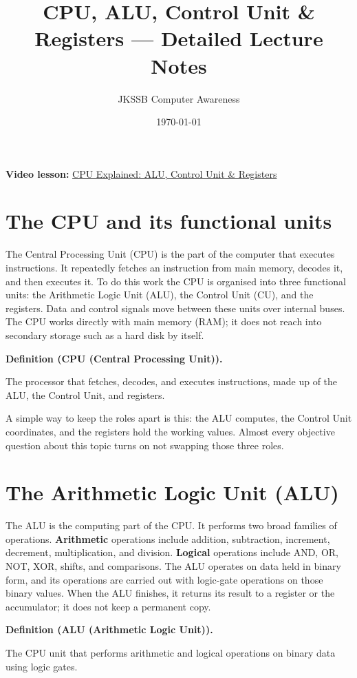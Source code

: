 \documentclass[11pt]{article}
\title{CPU, ALU, Control Unit \& Registers --- Detailed Lecture Notes}
\author{JKSSB Computer Awareness}
\date{\today}
\newenvironment{definitionbox}[1]{%
  \par\noindent\textbf{Definition (#1).}\ \itshape
}{\par\vspace{0.3em}}
\begin{document}
\maketitle

\noindent\textbf{Video lesson:}
\href{https://youtu.be/b6w8uT4GBYQ}{CPU Explained: ALU, Control Unit \& Registers}

\section{The CPU and its functional units}
The Central Processing Unit (CPU) is the part of the computer that executes
instructions. It repeatedly fetches an instruction from main memory, decodes
it, and then executes it. To do this work the CPU is organised into three
functional units: the Arithmetic Logic Unit (ALU), the Control Unit (CU),
and the registers. Data and control signals move between these units over
internal buses. The CPU works directly with main memory (RAM); it does not
reach into secondary storage such as a hard disk by itself.

\begin{definitionbox}{CPU (Central Processing Unit)}
The processor that fetches, decodes, and executes instructions, made up of
the ALU, the Control Unit, and registers.
\end{definitionbox}

A simple way to keep the roles apart is this: the ALU computes, the Control
Unit coordinates, and the registers hold the working values. Almost every
objective question about this topic turns on not swapping those three roles.

\section{The Arithmetic Logic Unit (ALU)}
The ALU is the computing part of the CPU. It performs two broad families of
operations. \textbf{Arithmetic} operations include addition, subtraction,
increment, decrement, multiplication, and division. \textbf{Logical}
operations include AND, OR, NOT, XOR, shifts, and comparisons. The ALU
operates on data held in binary form, and its operations are carried out with
logic-gate operations on those binary values. When the ALU finishes, it
returns its result to a register or the accumulator; it does not keep a
permanent copy.

\begin{definitionbox}{ALU (Arithmetic Logic Unit)}
The CPU unit that performs arithmetic and logical operations on binary data
using logic gates.
\end{definitionbox}
\end{document}
